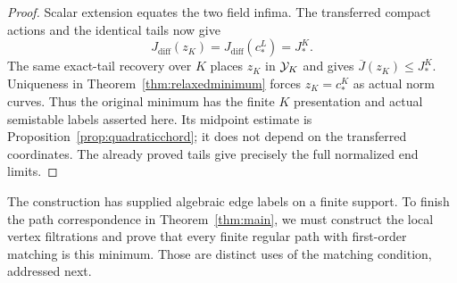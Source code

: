 \begin{proof}
Scalar extension equates the two field infima. The transferred
compact actions and the identical tails now give
\[
 J_{\mathrm{diff}}(z_K)=J_{\mathrm{diff}}(c_*^L)=J_*^K.
\]
The same exact-tail recovery over $K$ places $z_K$ in $\mathcal Y_K$
and gives $\overline J(z_K)\le J_*^K$. Uniqueness in
Theorem~\ref{thm:relaxedminimum} forces $z_K=c_*^K$ as actual
norm curves. Thus the original minimum has the finite $K$
presentation and actual semistable labels asserted here.
Its midpoint estimate is Proposition~\ref{prop:quadraticchord};
it does not depend on the transferred coordinates. The already
proved tails give precisely the full normalized end limits.
\end{proof}

The construction has supplied algebraic edge labels on a finite
support. To finish the path correspondence in
Theorem~\ref{thm:main}, we must construct the local vertex
filtrations and prove that every finite regular path with
first-order matching is this minimum. Those are distinct uses
of the matching condition, addressed next.
